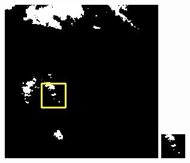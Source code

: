 \documentclass[UTF8]{ctexart}
\begin{document}
\begin{figure}[H]
{\begin{minipage}[b]{0.15\linewidth}
            \vspace{4pt}
            \includegraphics[width=1\linewidth]{../log/cut/LC81620432014072LGN00_16101_mask.jpg}\vspace{4pt}
            \includegraphics[width=1\linewidth]{../log/cut/tmp_cut_LC81620432014072LGN00_16101_mask.jpg}

\end{minipage}}
\end{figure}
\end{document}
